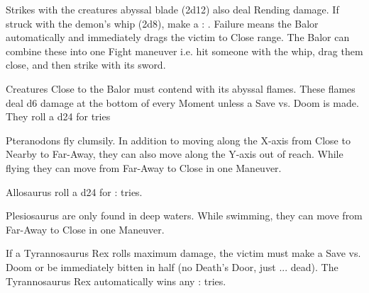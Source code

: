 {Strikes with the creatures abyssal blade (2d12) also deal Rending damage.  If struck with the demon's whip (2d8), make a \RS : \DEX.  Failure means the Balor automatically and immediately drags the victim to Close range.  The Balor can combine these into one Fight maneuver i.e. hit someone with the whip, drag them close, and then strike with its sword.

Creatures Close to the Balor must contend with its abyssal flames.  These flames deal d6 damage at the bottom of every Moment unless a Save vs. Doom is made.
They roll a d24 for  \RB tries

\newpage



\MONSTERBLOCK[
  Name=Pteranodon,
  Link=monster-pteranodon,
  MV=Base,
  WK=d16,
  DMG=d12 1 Nearby*,
  HD=5,
  Power=Average,
  Soak=0,
  Morale=Cowardly,
  Save=3,
  Extras={}
]
Pteranodons fly clumsily. In addition to moving along the X-axis from Close to Nearby to Far-Away, they can also move along the Y-axis out of reach.  
While flying they can move from Far-Away to Close in one Maneuver.


\MONSTERBLOCK[
  Name=Triceratops,
  Link=monster-triceratops,
  MV=Slow,
  WK=d12,
  DMG=d6+d8 1 Close,
  HD=6,
  Power=Strong,
  Soak=4,
  Morale=Cowardly,
  Save=4,
  Extras={}
]

\MONSTERBLOCK[
  Name=Allosaurus,
  Link=monster-allosaurus,
  MV=Fast,
  WK=d12,
  DMG=2d8 2 Close,
  HD=6,
  Power=Average,
  Soak=2,
  Morale=Cowardly,
  Save=4,
  Extras={Swift, Keen}
]

Allosaurus roll a d24 for \RB : \DEX tries.

\MONSTERBLOCK[
  Name=Plesiosarus,
  Link=monster-plesiosarus,
  MV=Base,
  WK=d10,
  DMG=2d8 2 Close,
  HD=7,
  Power=Average,
  Soak=2,
  Morale=Cowardly,
  Save=4,
  Extras={}
]
Plesiosaurus are only found in deep waters.  While swimming, they can move from Far-Away to Close in one Maneuver.

\MONSTERBLOCK[
  Name=Tyrannosaurus Rex,
  Link=monster-tyrannosaurus-rex,
  MV=Base,
  WK=d6,
  DMG=2d12 3 Close,
  HD=8,
  Power=Strong,
  Soak=4,
  Morale=n/a,
  Save=5,
  Extras={Bloodthirsty,  Grudge}
]

If a Tyrannosaurus Rex rolls maximum damage, the victim must make a Save vs. Doom or be immediately bitten in half (no Death's Door, just ... dead).  The Tyrannosaurus Rex automatically wins any \RB : \VIG tries.

}
